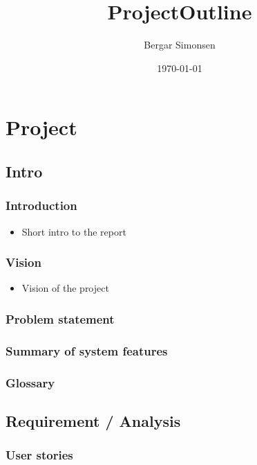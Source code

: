 \documentclass[11pt]{article}
\title{ProjectOutline}
\author{Bergar Simonsen}
\date{\today}
\begin{document}
\maketitle

\setcounter{tocdepth}{3}
\tableofcontents
\vspace*{1cm}
\section{Project}
\label{sec-1}
\subsection{Intro}
\label{sec-1-1}
\subsubsection{Introduction}
\label{sec-1-1-1}

\begin{itemize}
\item Short intro to the report
\end{itemize}
\subsubsection{Vision}
\label{sec-1-1-2}

\begin{itemize}
\item Vision of the project
\end{itemize}
\subsubsection{Problem statement}
\label{sec-1-1-3}
\subsubsection{Summary of system features}
\label{sec-1-1-4}
\subsubsection{Glossary}
\label{sec-1-1-5}
\subsection{Requirement / Analysis}
\label{sec-1-2}
\subsubsection{User stories}
\label{sec-1-2-1}
\end{document}
